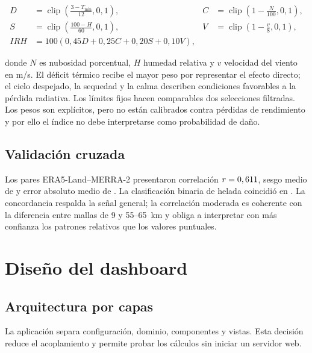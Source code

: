 \documentclass[11pt,a4paper]{article}
\begin{document}
\begin{align}
D &= \operatorname{clip}\!\left(\frac{3-T_{\min}}{12},0,1\right), &
C &= \operatorname{clip}\!\left(1-\frac{N}{100},0,1\right),\\
S &= \operatorname{clip}\!\left(\frac{100-H}{60},0,1\right), &
V &= \operatorname{clip}\!\left(1-\frac{v}{8},0,1\right),\\
IRH &= 100\left(0{,}45D+0{,}25C+0{,}20S+0{,}10V\right),
\label{eq:riesgo}
\end{align}

donde $N$ es nubosidad porcentual, $H$ humedad relativa y $v$ velocidad del viento en
m/s. El déficit térmico recibe el mayor peso por representar el efecto directo; el cielo
despejado, la sequedad y la calma describen condiciones favorables a la pérdida radiativa.
Los límites fijos hacen comparables dos selecciones filtradas. Los pesos son explícitos,
pero no están calibrados contra pérdidas de rendimiento y por ello el índice no debe
interpretarse como probabilidad de daño.

\subsection{Validación cruzada}

Los \NRegistros{} pares ERA5-Land--MERRA-2 presentaron correlación $r=0,611{}$, sesgo
medio de \FuenteSesgo{} y error absoluto medio de \FuenteMAE{}. La clasificación binaria
de helada coincidió en \FuenteConcordancia{}. La concordancia respalda la señal general;
la correlación moderada es coherente con la diferencia entre mallas de 9 y 55--65~km y
obliga a interpretar con más confianza los patrones relativos que los valores puntuales.

\section{Diseño del dashboard}

\subsection{Arquitectura por capas}

La aplicación separa configuración, dominio, componentes y vistas. Esta decisión reduce
el acoplamiento y permite probar los cálculos sin iniciar un servidor web.
\end{document}
